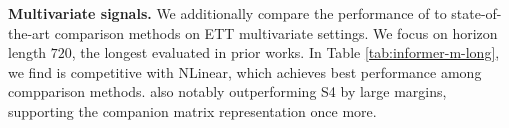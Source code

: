 



\textbf{Multivariate signals.} We additionally compare the performance of \ourmethod{} to state-of-the-art comparison methods on ETT multivariate settings. We focus on horizon length $720$, the longest evaluated in prior works. In Table \ref{tab:informer-m-long}, we find \ourmethod{} is competitive with NLinear, which achieves best performance among compparison methods. \ourmethod{} also notably outperforming S4 by large margins, supporting the companion matrix representation once more.   

